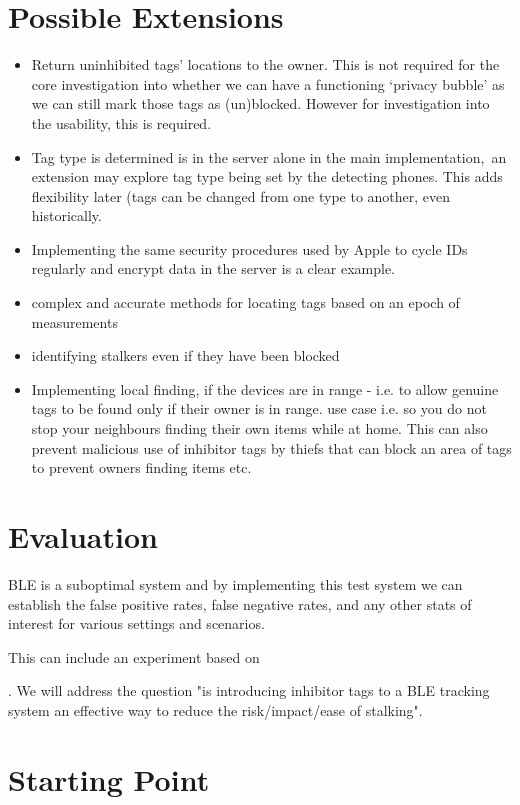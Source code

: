 \documentclass[12pt]{article}
\begin{document}
\section{Possible Extensions}
\begin{itemize}
\item{Return uninhibited tags' locations to the owner. This is not required for the core investigation into whether we can have a functioning `privacy bubble' as we can still mark those tags as (un)blocked. However for investigation into the usability, this is required. }
\item{Tag type is determined is in the server alone in the main implementation, an extension may explore tag type being set by the detecting phones. This adds flexibility later (tags can be changed from one type to another, even historically.}

\item{Implementing the same security procedures used by Apple to cycle IDs regularly and encrypt data in the server is a clear example.
}
\item{complex and accurate methods for locating tags based on an epoch of measurements}

\item{identifying stalkers even if they have been blocked}

\item{Implementing local finding, if the devices are in range - i.e. to allow genuine tags to be found only if their owner is in range. use case i.e. so you do not stop your neighbours finding their own items while at home. This can also prevent malicious use of inhibitor tags by thiefs that can block an area of tags to prevent owners finding items etc.}
\end{itemize}
\section{Evaluation}
 BLE is a suboptimal system and by implementing this test system we can establish the false positive rates, false negative rates, and any other stats of interest for various settings and scenarios.

This can include an experiment based on 

. We will address the question "is introducing inhibitor tags to a BLE tracking system an effective way to reduce the risk/impact/ease of stalking".


\section{Starting Point}
\end{document}
